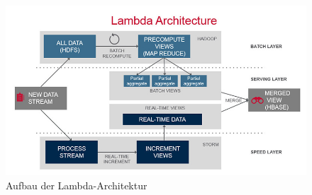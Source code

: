 \begin{figure}[h!]
	\centering
	\includegraphics[width=1.0\linewidth]{images/lambda-architecture}
	\caption{Aufbau der Lambda-Architektur} %
	\label{fig:cnn_structure}
\end{figure}